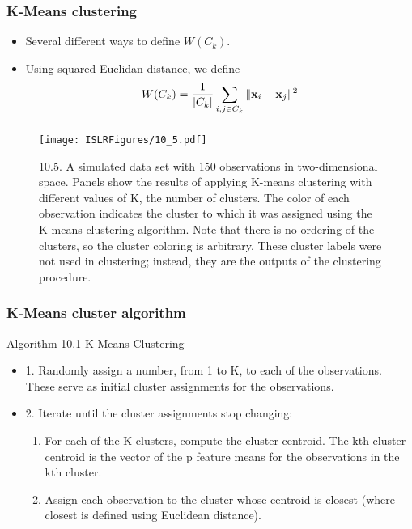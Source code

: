 \documentclass{beamer}
\def\bfx{{\bf x}}
\begin{document}
     	
     	\begin{frame}
     		\frametitle{K-Means clustering}
     		\begin{itemize}
     			\item Several different ways to define $W(C_k)$. 
     			
     			\item Using squared Euclidan distance, we define
     			$$ W(C_k)= {1 \over |C_k|}   \sum_{i, j \in C_k} \|\bfx_i - \bfx_j\|^2$$
     			 
     		 
     
     		 
     		\end{itemize}
     	\end{frame} 	
         
         \begin{frame}
         	\frametitle{ }
         	\begin{figure}
         		\centering
         		\texttt{[image: ISLRFigures/10\_5.pdf]}
         		\caption{\scriptsize   10.5. A simulated data set with 150 observations in two-dimensional
         			space. Panels show the results of applying K-means clustering with different values
         			of K, the number of clusters. The color of each observation indicates the cluster
         			to which it was assigned using the K-means clustering algorithm. Note that
         			there is no ordering of the clusters, so the cluster coloring is arbitrary. These
         			cluster labels were not used in clustering; instead, they are the outputs of the
         			clustering procedure.
         		}
         	\end{figure}
         \end{frame}
         
        
         
         \begin{frame}
         	\frametitle{K-Means cluster algorithm}
         	
         	 Algorithm 10.1 K-Means Clustering
         	\begin{itemize}
         		\item
         		1. Randomly assign a number, from 1 to K, to each of the observations.
         		These serve as initial cluster assignments for the observations.
         	\item 	2. Iterate until the cluster assignments stop changing:
         	\begin{enumerate}
         		\item   For each of the K clusters, compute the cluster centroid. The
         		kth cluster centroid is the vector of the p feature means for the
         		observations in the kth cluster.
         		\item Assign each observation to the cluster whose centroid is closest
         		(where closest is defined using Euclidean distance).
         	\end{enumerate}	
         		
         		
         		
         	\end{itemize}
         \end{frame} 	
         
\end{document}

